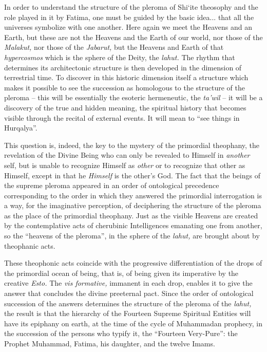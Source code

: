 \begin{quotationx}
In order to understand the structure of the pleroma of Shi`ite theosophy and the role played in it by Fatima, one must be guided by the basic idea... that all the universes symbolize with one another. Here again we meet the Heavens and an Earth, but these are not the Heavens and the Earth of our world, nor those of the \emph{Malakut,} nor those of the \emph{Jabarut,} but the Heavens and Earth of that \emph{hypercosmos} which is the sphere of the Deity, the \emph{lahut.} The rhythm that determines its architectonic structure is then developed in the dimension of terrestrial time. To discover in this historic dimension itself a structure which makes it possible to see the succession as homologous to the structure of the pleroma -- this will be essentially the esoteric hermeneutic, the \emph{ta'wil} -- it will be a discovery of the true and hidden meaning, the spiritual history that becomes visible through the recital of external events. It will mean to ``see things in Hurqalya''.

This question is, indeed, the key to the mystery of the primordial theophany, the revelation of the Divine Being who can only be revealed to Himself in \emph{another} self, but is unable to recognize Himself as \emph{other} or to recognize that other as Himself, except in that he \emph{Himself} is the other's God. The fact that the beings of the supreme pleroma appeared in an order of ontological precedence corresponding to the order in which they answered the primordial interrogation is a way, for the imaginative perception, of deciphering the structure of the pleroma as the place of the primordial theophany. Just as the visible Heavens are created by the contemplative acts of cherubinic Intelligences emanating one from another, so the ``heavens of the pleroma'', in the sphere of the \emph{lahut,} are brought about by theophanic acts.

These theophonic acts coincide with the progressive differentiation of the drops of the primordial ocean of being, that is, of being given its imperative by the creative \emph{Esto.} The \emph{vis formative,} immanent in each drop, enables it to give the answer that concludes the divine preeternal pact. Since the order of ontological succession of the answers determines the structure of the pleroma of the \emph{lahut,} the result is that the hierarchy of the Fourteen Supreme Spiritual Entities will have its epiphany on earth, at the time of the cycle of Muhammadan prophecy, in the succession of the persons who typify it, the ``Fourteen Very-Pure'': the Prophet Muhammad, Fatima, his daughter, and the twelve Imams.


\end{quotationx}
